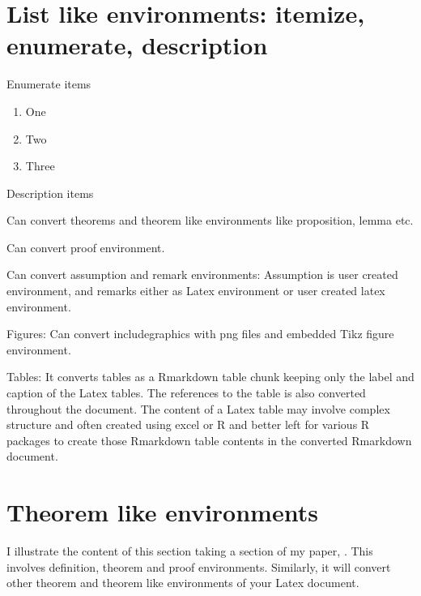 \documentclass[12pt,svgnames]{article}
\begin{document}

\section{List like environments: itemize, enumerate, description}\label{sec5}

Enumerate items

\begin{enumerate}
\item One
\item Two
\item Three
\end{enumerate}

Description items

\begin{description} 
  \item Can convert theorems and theorem like environments like proposition, lemma etc.

  \item Can convert proof environment. 
  
  \item Can convert assumption and remark environments: Assumption is user created environment, and remarks either as Latex environment or user created latex environment.
   
  \item Figures: Can convert includegraphics with png files and embedded Tikz figure environment. 
  
  \item Tables: It converts tables as a Rmarkdown table chunk keeping only the label and caption of the Latex tables. The references to the table is also converted throughout the document.  The content of a Latex table may involve complex structure and often created using excel or R and better left for various R packages to create those Rmarkdown table contents in the converted Rmarkdown document.
  
\end{description} 

\section{Theorem like environments} \label{sec6}
I illustrate the content of this section taking a section of my paper, \cite{Raut_2017a}. This involves definition, theorem and proof environments.  Similarly, it will convert other theorem and theorem like environments of your Latex document.
 
\end{document}
